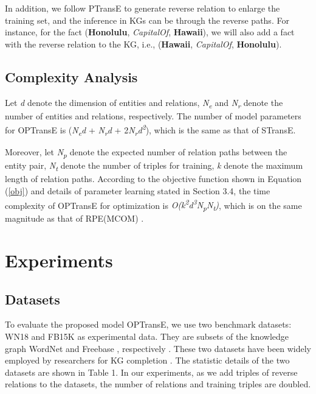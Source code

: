 \documentclass[11pt,a4paper]{article}
\begin{document}
In addition, we follow PTransE \cite{lin2015modeling} to generate reverse
relation  to enlarge the training set, and
the inference in KGs can be through the reverse paths. For instance,
for the fact (\textbf{Honolulu}, \textsl{CapitalOf},
\textbf{Hawaii}), we will also add a fact with the reverse relation
to the KG, i.e., (\textbf{Hawaii}, \textsl{CapitalOf},
\textbf{Honolulu}).


\subsection{Complexity Analysis}

Let \emph{d} denote the dimension of entities and relations,
\emph{N\textsubscript{e}} and \emph{N\textsubscript{r}} denote the
number of entities and relations, respectively. The number of model
parameters for OPTransE is (\emph{N\textsubscript{e}d} +
\emph{N\textsubscript{r}d} +
2\emph{N\textsubscript{r}d\textsuperscript{2}}), which is the same
as that of STransE.

Moreover, let \emph{N\textsubscript{p}} denote the expected number
of relation paths between the entity pair, \emph{N\textsubscript{t
}} denote the number of triples for training, \emph{k} denote the
maximum length of relation paths. According to the objective
function shown in Equation (\ref{obj}) and details of parameter
learning stated in Section 3.4, the time complexity of OPTransE for
optimization is
\emph{O(k\textsuperscript{2}d\textsuperscript{3}N\textsubscript{p}N\textsubscript{t})},
which is on the same magnitude as that of RPE(MCOM)
\cite{lin2018relation}.


\section{Experiments}

\subsection{Datasets}
To evaluate the proposed model OPTransE, we use two benchmark
datasets: WN18 and FB15K as experimental data. They are subsets of
the knowledge graph WordNet \cite{miller1995wordnet} and Freebase
\cite{bollacker2008freebase}, respectively
\cite{bordes2013translating}. These two datasets have
been widely employed by researchers for KG completion
\cite{jia2018path,lin2018relation}. The statistic details of the two
datasets are shown in Table 1. In our experiments, as we add triples
of reverse relations to the datasets, the number of relations and
training triples are doubled.
\end{document}
